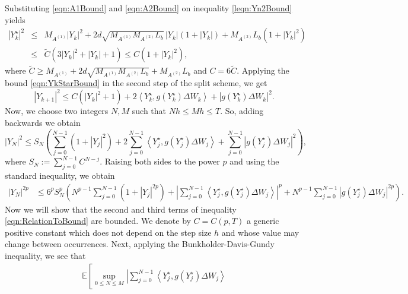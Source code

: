 \documentclass[sort&compress, preprint]{elsarticle}
\theoremstyle{definition}
\theoremstyle{plain}%
\theoremstyle{remark}
\newcommand{\m}[1]{\mathbb{E}#1}
\newcommand{\innerprod}[2]{\left\langle#1, #2\right\rangle}
\begin{document}
\begin{pf}
	Substituting \eqref{eqn:A1Bound} and \eqref{eqn:A2Bound}  on  inequality \eqref{leqn:Yn2Bound} yields
	\begin{eqnarray}\label{eqn:YkStarBound}
		|Y_k^{\star}|^2
		&\leq&	M_{A^{(1)}} |Y_k|^2
			+ 2 d \sqrt{M_{A^{(1)}} M_{A^{(2)}} L_b }\,|Y_k|(1+|Y_k|)
			+M_{A^{(2)}} L_b (1+|Y_k|^2) \nonumber\\
			&\leq& 
				\widetilde{C}(3|Y_k|^2+|Y_k| + 1) 			
			\leq C(1+|Y_k|^2),
	\end{eqnarray}
	where $\widetilde{C}\geq M_{A^{(1)}}+ 2 d \sqrt{M_{A^{(1)}} M_{A^{(2)}} L_b} + 
	M_{A^{(2)}} L_b$ and $C=6\widetilde{C}$. Applying  the bound \eqref{eqn:YkStarBound} 
	in the  second step of the split scheme, we get
	\begin{equation*}
		|Y_{k+1}|^2
		\leq
			C \left(
				|Y_k|^2 + 1
			\right)
			+ 2\innerprod{Y^{\star}_k}{g(Y^{\star}_k) \Delta W_k}
			+ \left|g(Y^{\star}_k) \Delta W_k \right|^2.
	\end{equation*}
	Now, we choose two integers $N,M$ such that $Nh\leq Mh \leq T$. So, adding 
	backwards we obtain
	\begin{equation*}
		|Y_N|^2
			\leq
			S_N\left(
				\sum_{j=0}^{N-1}
					(1+|Y_j|^2)
				+
				2\sum_{j=0}^{N-1}
					\innerprod{Y_j^{\star}}{g(Y_j^{\star}) \Delta W_j}
				+
				\sum_{j=0}^{N-1}
					\left|
						g(Y_j^{\star}) \Delta W_j
					\right|^2
			\right),
	\end{equation*}
	where	$S_N:=	\sum_{j=0}^{N-1}C^{N-j}$. Raising both sides to the power $p$ and 
	using the standard inequality, we obtain
	\begin{align}\label{eqn:RelationToBound}
		|Y_N|^{2p}	
			&\leq
				6^{p} S_N^p
				\left(
					N^{p-1}
						\sum_{j=0}^{N-1}
						(1+|Y_j|^{2p})	
					+
					\left|
						\sum_{j=0}^{N-1}
						\innerprod{Y_j^{\star}}{g(Y_j^{\star}) \Delta W_j}
					\right|^p
					+
					N^{p-1}
					\sum_{j=0}^{N-1}
						\left|
							g(Y_j^{\star}) \Delta W_j
						\right|^{2 p}				
				\right).
	\end{align}
	Now we will show that the second and third terms of inequality \eqref{eqn:RelationToBound} are bounded.
	We denote by $C=C(p,T)$ a generic positive constant which does not depend on  the step size $h$ and whose
	value may change between occurrences.	Next, applying the Bunkholder-Davis-Gundy 
	inequality, we see that
	\begin{align}\label{eqn:BoundSecondTerm}
		\m
		\left[
			\sup_{0\leq N \leq M}
			\left|
				\sum_{j=0}^{N-1}
					\innerprod{Y_j^{\star}}{g(Y_j^{\star})\Delta W_j}

\end{align}
\end{pf}
\end{document}
